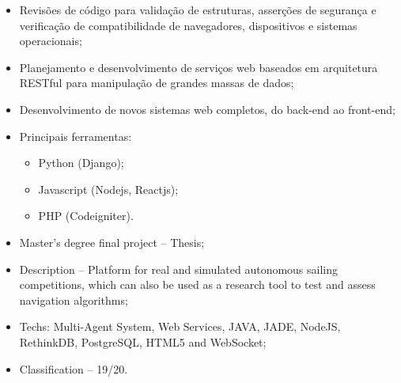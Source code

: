 \documentclass[10pt,a4paper]{altacv}
\begin{document}
\divider
%



\begin{itemize}
  \item Revisões de código para validação de estruturas, asserções de segurança e verificação de compatibilidade de navegadores, dispositivos e sistemas operacionais;
  \item Planejamento e desenvolvimento de serviços web baseados em arquitetura RESTful para manipulação de grandes massas de dados;
  \item Desenvolvimento de novos sistemas web completos, do back-end ao front-end;
  \item Principais ferramentas:
  \begin{itemize}
    \item Python (Django);
    \item Javascript (Nodejs, Reactjs);
    \item PHP (Codeigniter).
  \end{itemize}
\end{itemize}





\divider



\medskip

\clearpage

\iffalse




\begin{itemize}
  \item Master's degree final project -- Thesis;
  \item Description -- Platform for real and simulated autonomous sailing competitions, which can also be used as a research tool to test and assess navigation algorithms;
  \item Techs: Multi-Agent System, Web Services, JAVA, JADE, NodeJS, RethinkDB, PostgreSQL, HTML5 and WebSocket;
  \item Classification -- 19/20.
\end{itemize}
\end{document}
